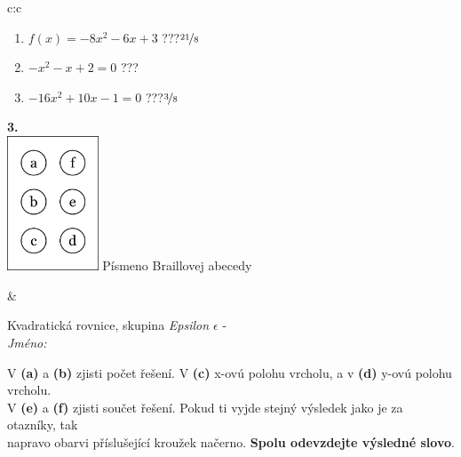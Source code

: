 \documentclass[10pt]{report}
\begin{document}
\begin{tabular}{c:c}
\begin{minipage}[c][104.5mm][t]{0.5\linewidth}
\begin{center}
\begin{minipage}{0.79\linewidth}
\begin{center}
\begin{varwidth}{\linewidth}
\begin{enumerate}
\item $f(x)=-8x^2-6x+3$\quad \dotfill\; ???\;\dotfill \quad $\nicefrac{21}{8}$
\item $-x^2-x+2=0$\quad \dotfill\; ???\;\dotfill {}
\item $-16x^2+10x-1=0$\quad \dotfill\; ???\;\dotfill \quad $\nicefrac{3}{8}$
\end{enumerate}
\end{varwidth}
\end{center}
\end{minipage}
\begin{minipage}{0.20\linewidth}
\begin{center}
{\Huge\bfseries 3.} \\[2mm]
\includegraphics[height=40mm]{../images/braille.png}
{\small Písmeno Braillovej abecedy}
\end{center}
\end{minipage}
\end{center}
\end{minipage}
&
\begin{minipage}[c][104.5mm][t]{0.5\linewidth}
\begin{center}
\vspace{7mm}
{\huge Kvadratická rovnice, skupina \textit{Epsilon $\epsilon$} -}\\[5mm]
\textit{Jméno:}\phantom{xxxxxxxxxxxxxxxxxxxxxxxxxxxxxxxxxxxxxxxxxxxxxxxxxxxxxxxxxxxxxxxxx}\\[5mm]
\begin{minipage}{0.95\linewidth}
\begin{center}
V \textbf{(a)} a \textbf{(b)} zjisti počet řešení. V \textbf{(c)} x-ovú polohu vrcholu, a v \textbf{(d)} y-ovú polohu vrcholu.\\V \textbf{(e)} a \textbf{(f)} zjisti součet řešení. Pokud ti vyjde stejný výsledek jako je za otazníky, tak\\napravo obarvi příslušející kroužek načerno. \textbf{Spolu odevzdejte výsledné slovo}.
\end{center}
\end{minipage}
\\[1mm]

\end{center}
\end{minipage}
\end{tabular}
\end{document}
